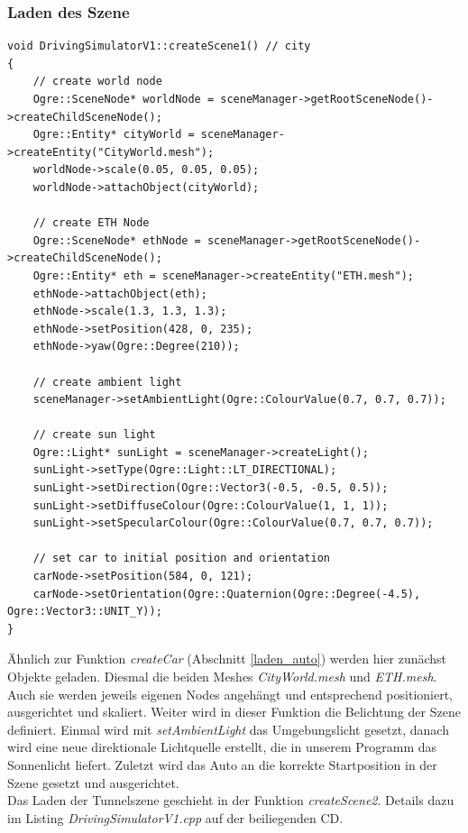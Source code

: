 \subsubsection{Laden des Szene}

\begin{lstlisting}[caption={Laden der Szene},label={laden_szene}]
void DrivingSimulatorV1::createScene1() // city
{
	// create world node
	Ogre::SceneNode* worldNode = sceneManager->getRootSceneNode()->createChildSceneNode();
	Ogre::Entity* cityWorld = sceneManager->createEntity("CityWorld.mesh");
	worldNode->scale(0.05, 0.05, 0.05);
	worldNode->attachObject(cityWorld);

	// create ETH Node
	Ogre::SceneNode* ethNode = sceneManager->getRootSceneNode()->createChildSceneNode();
	Ogre::Entity* eth = sceneManager->createEntity("ETH.mesh");
	ethNode->attachObject(eth);
	ethNode->scale(1.3, 1.3, 1.3);
	ethNode->setPosition(428, 0, 235);
	ethNode->yaw(Ogre::Degree(210));

	// create ambient light
	sceneManager->setAmbientLight(Ogre::ColourValue(0.7, 0.7, 0.7));

	// create sun light
	Ogre::Light* sunLight = sceneManager->createLight();
	sunLight->setType(Ogre::Light::LT_DIRECTIONAL);
	sunLight->setDirection(Ogre::Vector3(-0.5, -0.5, 0.5));
	sunLight->setDiffuseColour(Ogre::ColourValue(1, 1, 1));
	sunLight->setSpecularColour(Ogre::ColourValue(0.7, 0.7, 0.7));

	// set car to initial position and orientation
	carNode->setPosition(584, 0, 121);
	carNode->setOrientation(Ogre::Quaternion(Ogre::Degree(-4.5), Ogre::Vector3::UNIT_Y));
}
\end{lstlisting}

Ähnlich zur Funktion \textit{createCar} (Abschnitt \ref{laden_auto}) werden hier zunächst Objekte geladen. Diesmal die beiden Meshes \textit{CityWorld.mesh} und \textit{ETH.mesh}. Auch sie werden jeweils eigenen Nodes angehängt und entsprechend positioniert, ausgerichtet und skaliert. Weiter wird in dieser Funktion die Belichtung der Szene definiert. Einmal wird mit \textit{setAmbientLight} das Umgebungslicht gesetzt, danach wird eine neue direktionale Lichtquelle erstellt, die in unserem Programm das Sonnenlicht liefert. Zuletzt wird das Auto an die korrekte Startposition in der Szene gesetzt und ausgerichtet.\\Das Laden der Tunnelszene geschieht in der Funktion \textit{createScene2}. Details dazu im Listing \textit{DrivingSimulatorV1.cpp} auf der beiliegenden CD.

